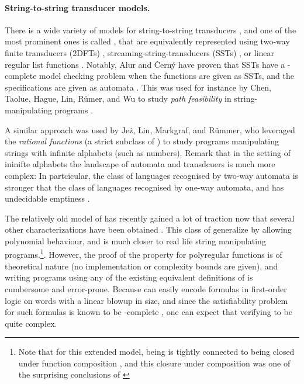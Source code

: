 \paragraph{String-to-string transducer models.} There is a wide variety of
models for string-to-string transducers \cite{MUSC19}, and one of the most
prominent ones is called , that are
equivalently represented using two-way finite transducers (2DFTs)
\cite{RASCO59}, streaming-string-transducers (SSTs) \cite{ALUR11}, or linear
regular list functions \cite{BDK18}. Notably, Alur and Černý have proven
that SSTs have a \PSPACE-complete model checking problem when the functions are
given as SSTs, and the specifications are given as automata
\cite[Theorem 13]{ALCE11}. This was used for instance by Chen, Taolue, Hague,
Lin, Rümer, and Wu to study \emph{path feasibility} in string-manipulating
programs \cite{CHLRW19}.

A similar approach was used by Jeż, Lin, Markgraf, and Rümmer,
who leveraged the \emph{rational functions} (a strict subclass of ) 
to study programs manipulating strings with infinite alphabets (such as numbers). 
Remark that in the setting of ininifte alphabets the landscape of automata and transdcuers
is much more complex: In partcicular, the class of languages recognised by two-way automata is 
stronger that the class of languages recognised by one-way automata, and has undecidable emptiness
\cite[Figure 1.1]{BOJA19}.

\AP The relatively old model of  \cite{ENMA02} has recently gained a lot of traction now that
several other characterizations have been obtained
\cite{bojanczyk2018polyregular,bojanczyk2019string}. This class of
 generalize  by
allowing polynomial behaviour, and is much closer to real life string
manipulating programs.\footnote{Note that for this extended model, being
   is tightly connected to being closed under
function composition \cite[Proposition III.3]{FIRELH25}, and this closure under
composition was one of the surprising conclusions of
\cite{bojanczyk2018polyregular}}. However, the proof of the  property for polyregular functions is of theoretical nature (no
implementation or complexity bounds are given), and writing programs using any
of the existing equivalent definitions of  is
cumbersome and error-prone. Because  can easily
encode formulas in first-order logic on words with a linear blowup in size, and
since the satisfiability problem for such formulas is known to be
\TOWER-complete \cite[Theorem 13.5]{REINH02}, one can expect that verifying
 to be quite complex.

